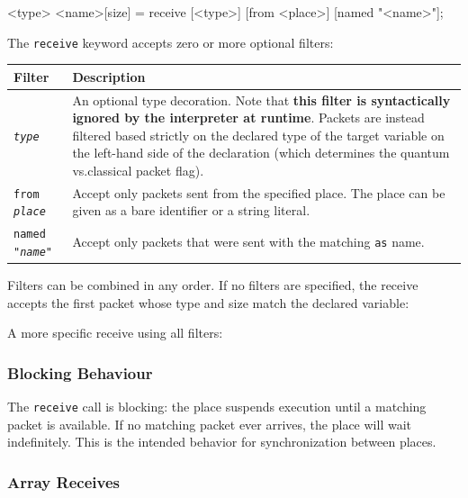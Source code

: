 \begin{codebox}
<type> <name>[size] = receive [<type>] [from <place>] [named "<name>"];
\end{codebox}

The \texttt{receive} keyword accepts zero or more optional filters:

\begin{center}
\begin{tabular}{|l|p{9cm}|}
\hline
\textbf{Filter} & \textbf{Description} \\
\hline
\texttt{\textit{type}} &
    An optional type decoration. Note that \textbf{this filter is syntactically ignored by the interpreter at runtime}. Packets are instead filtered based strictly on the declared type of the target variable on the left-hand side of the declaration (which determines the quantum vs.\@ classical packet flag). \\
\hline
\texttt{from \textit{place}} &
    Accept only packets sent from the specified place. The place can be
    given as a bare identifier or a string literal. \\
\hline
\texttt{named "\textit{name}"} &
    Accept only packets that were sent with the matching \texttt{as} name. \\
\hline
\end{tabular}
\end{center}

Filters can be combined in any order. If no filters are specified, the receive
accepts the first packet whose type and size match the declared variable:



A more specific receive using all filters:



\subsubsection{Blocking Behaviour}

The \texttt{receive} call is blocking: the place suspends execution
until a matching packet is available. If no matching packet ever arrives, the
place will wait indefinitely. This is the intended behavior for synchronization
between places.

\subsubsection{Array Receives}


